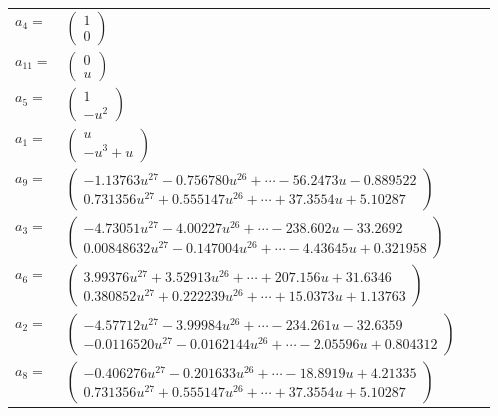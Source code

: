 \documentclass[1p]{elsarticle_modified}
\theoremstyle{definition}
\begin{document}
\begin{tabular}{m{7pt} m{180pt} m{7pt} m{180pt} }
\flushright $a_{4}=$&$\begin{pmatrix}1\\0\end{pmatrix}$ \\
\flushright $a_{11}=$&$\begin{pmatrix}0\\u\end{pmatrix}$ \\
\flushright $a_{5}=$&$\begin{pmatrix}1\\- u^2\end{pmatrix}$ \\
\flushright $a_{1}=$&$\begin{pmatrix}u\\- u^3+u\end{pmatrix}$ \\
\flushright $a_{9}=$&$\begin{pmatrix}-1.13763 u^{27}-0.756780 u^{26}+\cdots-56.2473 u-0.889522\\0.731356 u^{27}+0.555147 u^{26}+\cdots+37.3554 u+5.10287\end{pmatrix}$ \\
\flushright $a_{3}=$&$\begin{pmatrix}-4.73051 u^{27}-4.00227 u^{26}+\cdots-238.602 u-33.2692\\0.00848632 u^{27}-0.147004 u^{26}+\cdots-4.43645 u+0.321958\end{pmatrix}$ \\
\flushright $a_{6}=$&$\begin{pmatrix}3.99376 u^{27}+3.52913 u^{26}+\cdots+207.156 u+31.6346\\0.380852 u^{27}+0.222239 u^{26}+\cdots+15.0373 u+1.13763\end{pmatrix}$ \\
\flushright $a_{2}=$&$\begin{pmatrix}-4.57712 u^{27}-3.99984 u^{26}+\cdots-234.261 u-32.6359\\-0.0116520 u^{27}-0.0162144 u^{26}+\cdots-2.05596 u+0.804312\end{pmatrix}$ \\
\flushright $a_{8}=$&$\begin{pmatrix}-0.406276 u^{27}-0.201633 u^{26}+\cdots-18.8919 u+4.21335\\0.731356 u^{27}+0.555147 u^{26}+\cdots+37.3554 u+5.10287\end{pmatrix}$ \\

\end{tabular}
\end{document}
